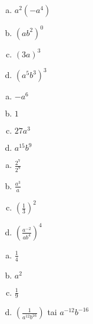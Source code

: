    \begin{tehtava}%
        \begin{enumerate}[a)]
        	\item $a^2(-a^4) $ 
        	\item $(ab^2)^0$ 
        	\item $(3a)^3$ 
        	\item $(a^5b^3)^3$
		\end{enumerate}        
        \begin{vastaus}
        \begin{enumerate}[a)]
            \item $-a^6$ 
            \item $1$ 
            \item $27a^3$ 
            \item $a^{15}b^9$
        \end{enumerate}
        \end{vastaus}
    \end{tehtava} 
    
    \begin{tehtava}%
        \begin{enumerate}[a)]
        	\item $\frac{2^7}{2^9}$ 
        	\item $\frac{a^3}{a}$ 
        	\item $\left(\frac{1}{3}\right)^2$ 
        	\item $\left(\frac{a^{-2}}{ab^4}\right)^4$
		\end{enumerate}        
        \begin{vastaus}
        \begin{enumerate}[a)]
            \item $\frac{1}{4}$ 
            \item $a^2$ 
            \item $\frac{1}{9} $ 
            \item $ \left(\frac{1}{a^{12}b^{16}}\right)$ tai $a^{-12}b^{-16}$
        \end{enumerate}
        \end{vastaus}
    \end{tehtava}     
